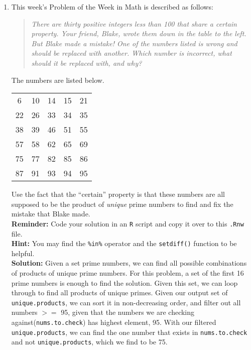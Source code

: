 \documentclass{article}\usepackage[]{graphicx}\usepackage[]{xcolor}
\begin{document}
\begin{enumerate}
\item This week's Problem of the Week in Math is described as follows:
\begin{quotation}
  \textit{There are thirty positive integers less than 100 that share a certain 
  property. Your friend, Blake, wrote them down in the table to the left. But 
  Blake made a mistake! One of the numbers listed is wrong and should be replaced 
  with another. Which number is incorrect, what should it be replaced with, and 
  why?}
\end{quotation}
The numbers are listed below.
\begin{center}
  \begin{tabular}{ccccc}
    6 & 10 & 14 & 15 & 21\\
    22 & 26 & 33 & 34 & 35\\
    38 & 39 & 46 & 51 & 55\\
    57 & 58 & 62 & 65 & 69\\
    75 & 77 & 82 & 85 & 86\\
    87 & 91 & 93 & 94 & 95
  \end{tabular}
\end{center}
Use the fact that the ``certain'' property is that these numbers are all supposed
to be the product of \emph{unique} prime numbers to find and fix the mistake that
Blake made.\\
\textbf{Reminder:} Code your solution in an \texttt{R} script and copy it over
to this \texttt{.Rnw} file.\\
\textbf{Hint:} You may find the \verb|%in%| operator and the \verb|setdiff()| function to be helpful.\\

\textbf{Solution:} 
Given a set prime numbers, we can find all possible combinations of products of unique prime numbers. For this problem, a set of the first 16 prime numbers is enough to find the solution. Given this set, we can loop through to find all products of unique primes. Given our output set of \texttt{unique.products}, we can sort it in non-decreasing order, and filter out all numbers $>=$ 95, given that the numbers we are checking against(\texttt{nums.to.check}) has highest element, 95. With our filtered \texttt{unique.products}, we can find the one number that exists in \texttt{nums.to.check} and not \texttt{unique.products}, which we find to be 75. 


\end{enumerate}
\end{document}
